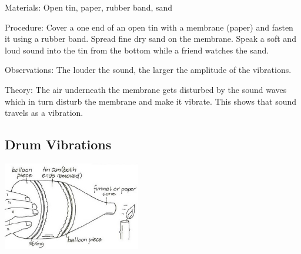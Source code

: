 \begin{multicols}{2}
\begin{description*}
\item[Materials:]{Open tin, paper, rubber band, sand}
\item[Procedure:]{Cover a one end of an open tin with a membrane (paper) and fasten it using a rubber band. Spread fine dry sand on the membrane. Speak a soft and loud sound into the tin from the bottom while a friend watches the sand.}
\item[Observations:]{The louder the sound, the larger the amplitude of the vibrations.}
\item[Theory:]{The air underneath the membrane gets disturbed by the sound waves which in turn disturb the membrane and make it vibrate. This shows that sound travels as a vibration.}
\end{description*}

\columnbreak

\subsection{Drum Vibrations}

\begin{center}
\includegraphics[width=0.45\textwidth]{./img/vso/drum-vibrations.jpg}
\end{center}


\end{multicols}
